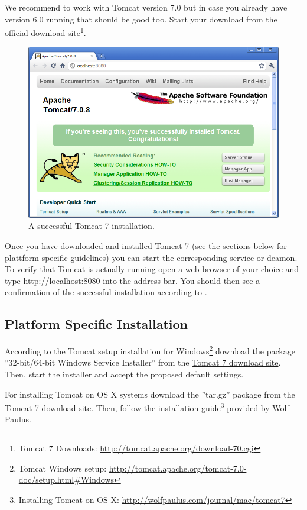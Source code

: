\documentclass[a4paper,10pt,twoside]{book}
\begin{document}
We recommend to work with Tomcat version 7.0 but in case you already have version 6.0 running that should be good too.
Start your download from the official download site\footnote{
Tomcat 7 Downloads: \url{http://tomcat.apache.org/download-70.cgi}
}.

\begin{figure}
\includegraphics[width=13cm]{tomcat_install.png}
\caption{A successful Tomcat 7 installation.}
\end{figure}

Once you have downloaded and installed Tomcat 7 (see the sections below for plattform specific guidelines) you can start the corresponding service or deamon.
To verify that Tomcat is actually running open a web browser of your choice and type \url{http://localhost:8080} into the address bar.
You should then see a confirmation of the successful installation according to .

\subsection{Platform Specific Installation}

According to the Tomcat setup installation for Windows\footnote{
Tomcat Windows setup: \url{http://tomcat.apache.org/tomcat-7.0-doc/setup.html#Windows}
}
download the package ''32-bit/64-bit Windows Service Installer'' from the \href{http://tomcat.apache.org/download-70.cgi}{Tomcat 7 download site}.
Then, start the installer and accept the proposed default settings.

For installing Tomcat on OS X systems download the ''tar.gz'' package from the \href{http://tomcat.apache.org/download-70.cgi}{Tomcat 7 download site}.
Then, follow the installation guide\footnote{
Installing Tomcat on OS X: \url{http://wolfpaulus.com/journal/mac/tomcat7}
} provided by Wolf Paulus.
\end{document}
